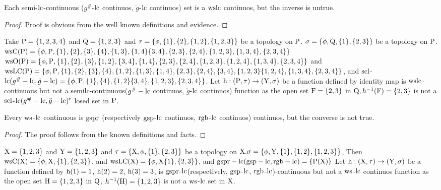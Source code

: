 \begin{thm}\label{thm6.3.7}
Each semi-$\mathrm{lc}$-continuous ($g^{\text{\#}}$-$\mathrm{lc}$ continuos, $\ddot{g}$-$\mathrm{lc}$ continuos) set is a $\mathrm{ws}\mathrm{lc}$ continuos, but the inverse is untrue.
\end{thm}

\begin{proof}
Proof is obvious from the well known definitions and evidence.
\end{proof}

\begin{exm}\label{exam6.3.8}
Take $\mathrm{P} = \{1,2,3,4\}$ and $\mathrm{Q}= \{1,2,3\}$ and $\tau = \{\phi, \{1\},\{2\}, \{1,2\},\break \{1,2,3\}\}$ be a topology on $\mathrm{P}$. $\sigma = \{\phi, \mathrm{Q}, \{1\},\{ 2, 3\}\}$ be a topology on $\mathrm{P}$. $\mathrm{ws}\mathrm{C}(\mathrm{P}) = \{\phi, \mathrm{P},\{1\}, \{2\}, \{3\}, \{4\},\{1,3\}, \{1, 4\} \{3,4\}, \{2,3\}, \{2,4\}, \{1,2, 3\},\{1,3,4\},\{2,3,4\}\}$\break $\ws\TSO(\TSP) = \{\phi, \TSP, \{1\}, \{2\}, \{3\},\{1,2\},\{3,4\}, \{1,4\}, \{2,3\}, \{2,4\}, \{1,2,3\}, \{1,2,4\},\break \{1,3,4\},\{2,3,4\}\}$ and $\ws\LC(\TSP)= \{\phi, \TSP ,\{1\}, \{2\},\{3\},\{4\},\{1,2\},\{1,3\}, \{1,4\},\break \{2,3\}, \{2,4\},\{3,4\}, \{1,2,3\}\{1,2,4\},\{1,3,4\},\{2,3,4\}\}$, and $\mathrm{scl}$-$\mathrm{lc}(g^{\text{\#}}-\mathrm{lc}, \ddot{g}-\mathrm{lc}) = \{\phi, \mathrm{P},\{1\},\{4\},\{1,2\}\{3, 4\},\{1,2,3\},\{2,3,4\}\}$. Let $\mathrm{h}: (\mathrm{P}, \tau )\to(\mathrm{Y}, \sigma)$ be a function defined by identity map is $\mathrm{ws}\mathrm{lc}$-continuous but not a semilc-continuous($g^{\text{\#}} -\mathrm{lc}$ continuos, $\ddot{g}$-$\mathrm{lc}$ continuos) function as the open set $\mathrm{F}=\{2,3\}$ in $\mathrm{Q}, h^{-1} (\mathrm{F})=\{2,3\}$ is not a $\mathrm{scl}$-$\mathrm{lc}(g^{\text{\#}} -\mathrm{lc}, \ddot{g} -\mathrm{lc})^{\text{c}}$ losed set in $\mathrm{P}$.
\end{exm}

\begin{thm}\label{thm6.3.9}
Every $\mathrm{ws}$-$\mathrm{lc}$ continuous is $\mathrm{gspr}$ (respectively $\mathrm{gsp}$-$\mathrm{lc}$ continuos, $\mathrm{rgb}$-$\mathrm{lc}$ continuos) continuos, but the converse is not true.
\end{thm}

\begin{proof}
The proof follows from the known definitions and facts.
\end{proof}

\begin{exm}\label{exam6.3.10}
$\mathrm{X} = \{1, 2, 3\}$ and $\mathrm{Y}= \{1, 2, 3\}$ and $\tau = \{\mathrm{X}, \phi, \{1\}, \{2, 3\}\}$ be a topology on $\mathrm{X}. \sigma = \{\phi, \mathrm{Y}, \{1\}, \{1, 2\}, \{1, 2, 3\}\}$, Then $\mathrm{ws}\mathrm{C}(\mathrm{X}) = \{\phi, \mathrm{X}, \{1\}, \{2, 3\}\}$. and $\mathrm{ws}\mathrm{LC}(\mathrm{X})= \{\phi, \mathrm{X} \{1\}, \{2, 3\}\}$, and $\mathrm{gspr} - \mathrm{lc}(\mathrm{gsp}-\mathrm{lc}, \mathrm{rgb}-\mathrm{lc}) = \{\mathrm{P}(\mathrm{X})\}$ Let $\mathrm{h}: (\mathrm{X}, \tau)\to(\mathrm{Y}, \sigma)$ be a function defined by $\mathrm{h}(1)= 1$, $\mathrm{h}(2)=2$, $\mathrm{h}(3)=3$, is $\mathrm{gspr}$-$\mathrm{lc}$(respectively, $\mathrm{gsp}$-$\mathrm{lc}$, $\mathrm{rgb}$-$\mathrm{lc}$)-continuous but not a $\mathrm{ws}$-$\mathrm{lc}$ continuos function as the open set $\mathrm{H}=\{1,2,3\}$ in $\mathrm{Q}$, $h^{-1}(\mathrm{H})=\{1,2,3\}$ is not a $\mathrm{ws}$-$\mathrm{lc}$ set in $\mathrm{X}$.
\end{exm}

